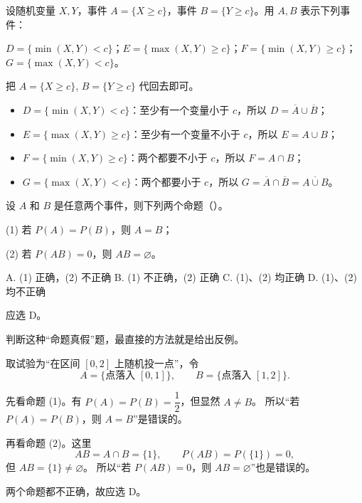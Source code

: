 ﻿\documentclass[lang=cn,11pt]{elegantbook}
\begin{document}
\begin{exercise}\label{exer:1-30}
设随机变量 \(X,Y\)，事件 \(A=\{X\ge c\}\)，事件 \(B=\{Y\ge c\}\)。用 \(A,B\) 表示下列事件：\par
\(D=\{\min(X,Y)<c\}\)；\quad \(E=\{\max(X,Y)\ge c\}\)；\quad \(F=\{\min(X,Y)\ge c\}\)；\quad \(G=\{\max(X,Y)<c\}\)。
\end{exercise}

\begin{solution}
把 \(A=\{X\ge c\}\), \(B=\{Y\ge c\}\) 代回去即可。
\begin{itemize}
    \item \(D=\{\min(X,Y)<c\}\)：至少有一个变量小于 \(c\)，所以 \(D=\overline{A}\cup\overline{B}\)；
    \item \(E=\{\max(X,Y)\ge c\}\)：至少有一个变量不小于 \(c\)，所以 \(E=A\cup B\)；
    \item \(F=\{\min(X,Y)\ge c\}\)：两个都要不小于 \(c\)，所以 \(F=A\cap B\)；
    \item \(G=\{\max(X,Y)<c\}\)：两个都要小于 \(c\)，所以 \(G=\overline{A}\cap\overline{B}=\overline{A\cup B}\)。
\end{itemize}
\end{solution}

\begin{exercise}\label{exer:1-31}
设 \(A\) 和 \(B\) 是任意两个事件，则下列两个命题（\quad）。\par
(1) 若 \(P(A)=P(B)\)，则 \(A=B\)；\par
(2) 若 \(P(AB)=0\)，则 \(AB=\varnothing\)。
\par
A. (1) 正确，(2) 不正确\quad
B. (1) 不正确，(2) 正确\quad
C. (1)、(2) 均正确\quad
D. (1)、(2) 均不正确
\end{exercise}

\begin{solution}
应选 D。

判断这种“命题真假”题，最直接的方法就是给出反例。

取试验为“在区间 \([0,2]\) 上随机投一点”，令
\[
A=\{\text{点落入 }[0,1]\},\qquad B=\{\text{点落入 }[1,2]\}.
\]

先看命题 (1)。有
\(P(A)=P(B)=\dfrac12\)，但显然 \(A\ne B\)。
所以“若 \(P(A)=P(B)\)，则 \(A=B\)”是错误的。

再看命题 (2)。这里
\[
AB=A\cap B=\{1\},\qquad P(AB)=P(\{1\})=0,
\]
但 \(AB=\{1\}\ne\varnothing\)。
所以“若 \(P(AB)=0\)，则 \(AB=\varnothing\)”也是错误的。

两个命题都不正确，故应选 D。
\end{solution}
\end{document}
